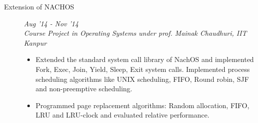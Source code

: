 \documentclass[9pt]{article}
\newenvironment{changemargin}[2]{%
  \begin{list}{}{%
      \setlength{\topsep}{0pt}%
    \setlength{\leftmargin}{#1}%
    \setlength{\rightmargin}{#2}%
    \setlength{\listparindent}{\parindent}%
  \setlength{\itemindent}{\parindent}%
    \setlength{\parsep}{\parskip}%
    }%
  \item[]}{\end{list}
    }
\newenvironment{body} {
  \vspace*{-16pt}
        \begin{changemargin}{-0.6in}{-0.65in}
        }	
        {\end{changemargin}
}
\begin{document}
\begin{body}
\begin{description}
\item[\normalsize{Extension of NACHOS}]  \hfill \textit{Aug '14 - Nov '14} \\
  \textit{Course Project in Operating Systems under prof. Mainak Chaudhuri, IIT Kanpur}
  \begin{itemize}
    \item Extended the standard system call library of NachOS and implemented 
      Fork, Exec, Join, Yield, Sleep, Exit system calls. Implemented process 
      scheduling algorithms like UNIX scheduling, FIFO, Round robin, SJF and non-preemptive scheduling.
    \item Programmed page replacement algorithms: Random allocation, FIFO, LRU 
      and LRU-clock and evaluated relative performance.
  \end{itemize}





\end{description}
\end{body}
\end{document}
